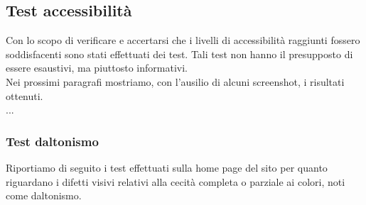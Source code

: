 \subsection{Test accessibilità}
Con lo scopo di verificare e accertarsi che i livelli di accessibilità raggiunti fossero soddisfacenti sono stati effettuati dei test. Tali test non hanno il presupposto di essere esaustivi, ma piuttosto informativi.\\
Nei prossimi paragrafi mostriamo, con l'ausilio di alcuni screenshot, i risultati ottenuti.\\
...
\subsubsection{Test daltonismo}
Riportiamo di seguito i test effettuati sulla home page del sito per quanto riguardano i difetti visivi relativi alla cecità completa o parziale ai colori, noti come daltonismo.
